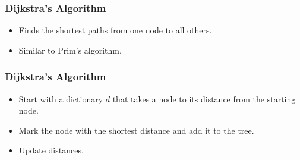 \documentclass{beamer}
\begin{document}
\begin{frame}
\frametitle{Dijkstra's Algorithm}

\begin{itemize}
\item Finds the shortest paths from one node to all others.
\item Similar to Prim's algorithm.
\end{itemize}

\end{frame}
\begin{frame}
\frametitle{Dijkstra's Algorithm}
\begin{itemize}
\item Start with a dictionary $d$ that takes a node to its distance from the starting node.
\item Mark the node with the shortest distance and add it to the tree.
\item Update distances.
\end{itemize}
\end{frame}
\end{document}
